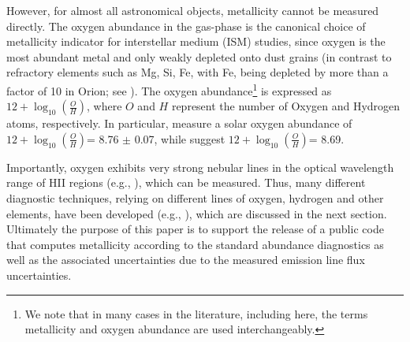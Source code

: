 \documentclass{emulateapj}
\newcommand{\oxab}{\ensuremath{12 + \log_{10}(\frac{O}{H})}}
\begin{document}

However, for almost all astronomical objects, metallicity cannot be measured directly. The oxygen abundance in the gas-phase is the canonical choice of metallicity indicator for interstellar medium (ISM) studies, since oxygen is the most abundant metal and only weakly depleted onto dust grains (in contrast to refractory elements such as Mg, Si, Fe, with Fe, being depleted by more than a factor of 10 in Orion; see \citealt{simondiaz11-orion}). The oxygen abundance\footnote{We note that in many cases in the literature, including here, the terms metallicity and oxygen abundance are used interchangeably.} is expressed as  \oxab, where $O$ and $H$ represent the number of Oxygen and Hydrogen atoms, respectively. In particular, \citep{chaffau11} measure a solar oxygen abundance of \oxab = 8.76 $\pm$ 0.07, while \citet{asplund09_rev} suggest \oxab = 8.69.

Importantly, oxygen exhibits very strong nebular lines in the optical wavelength range of HII regions (e.g., \citealt{pagel79,osterbrock89,tremonti04}), which can be measured. 
Thus, many different diagnostic techniques, relying on different lines of oxygen, hydrogen and other elements, have been developed (e.g., \citealt{kewley02,pettini04,kobulnicky04,kewley08}), which are discussed in the next section. Ultimately the  purpose of this paper is to support the release of a public code that computes metallicity according to the standard abundance diagnostics as well as the associated uncertainties due to the measured emission line flux uncertainties.

\end{document}
